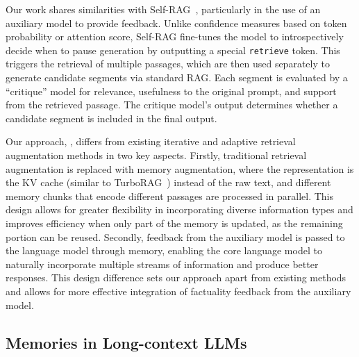Our work shares similarities with Self-RAG~\citep{asai2024selfrag}, particularly in the use of an auxiliary model to provide feedback. Unlike confidence measures based on token probability or attention score, Self-RAG fine-tunes the model to introspectively decide when to pause generation by outputting a special \texttt{retrieve} token. This triggers the retrieval of multiple passages, which are then used separately to generate candidate segments via standard RAG.
Each segment is evaluated by a ``critique'' model for relevance, usefulness to the original prompt, and support from the retrieved passage. The critique model's output determines whether a candidate segment is included in the final output.

Our approach, \model, differs from existing iterative and adaptive retrieval augmentation methods in two key aspects. Firstly, traditional retrieval augmentation is replaced with memory augmentation, where the representation is the KV cache (similar to TurboRAG~\citep{lu2024turborag}) instead of the raw text, and different memory chunks that encode different passages are processed in parallel. This design allows for greater flexibility in incorporating diverse information types and improves efficiency when only part of the memory is updated, as the remaining portion can be reused. Secondly, feedback from the auxiliary model is passed to the language model through memory, enabling the core language model to naturally incorporate multiple streams of information and produce better responses. This design difference sets our approach apart from existing methods and allows for more effective integration of factuality feedback from the auxiliary model.

\subsection{Memories in Long-context LLMs}


